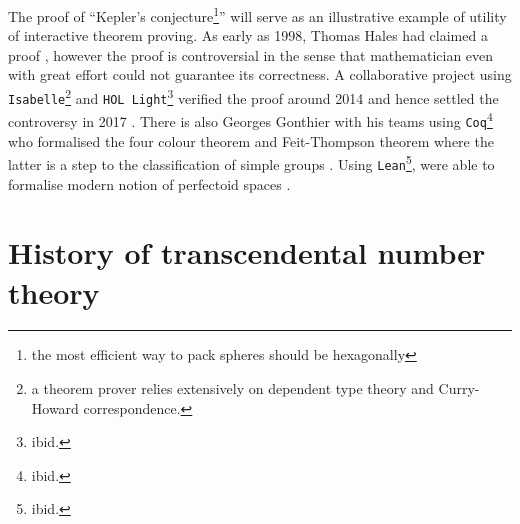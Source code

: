 \documentclass{report}
\begin{document}
The proof of ``Kepler's conjecture\footnote{the most efficient way to pack spheres should be hexagonally}'' will serve as an illustrative example of utility of interactive theorem proving. As early as 1998, Thomas Hales had claimed a proof \cite{hales1998kepler,harrison2014history}, however the proof is controversial in the sense that mathematician even with great effort could not guarantee its correctness. A collaborative project using {\tt Isabelle}\footnote{a theorem prover relies extensively on dependent type theory and Curry-Howard correspondence.} and {\tt HOL Light}\footnote{ibid.} verified the proof around 2014 and hence settled the controversy in 2017 \cite{hales2017formal}. There is also Georges Gonthier with his teams using {\tt Coq}\footnote{ibid.} who formalised the four colour theorem and Feit-Thompson theorem where the latter is a step to the classification of simple groups \cite{gonthier2008formal, gonthier2013machine}. Using {\tt Lean}\footnote{ibid.},  were able to formalise modern notion of perfectoid spaces \cite{buzzard2020formalising}.

\section{History of transcendental number theory}
\end{document}
